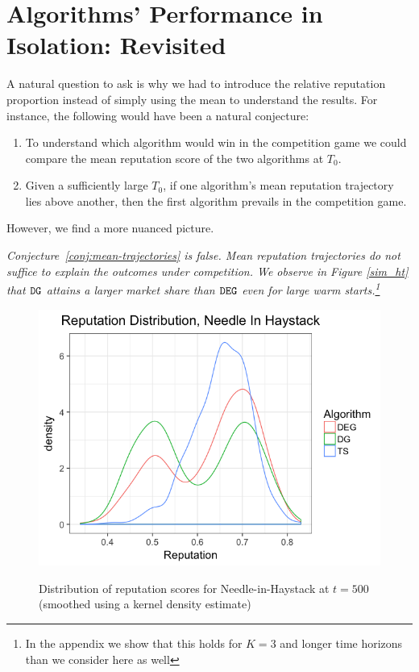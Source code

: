 \documentclass[../competing_bandits.tex]{subfiles}
\begin{document}
\section{Algorithms' Performance in Isolation: Revisited}\label{section:revisited}

A natural question to ask is why we had to introduce the relative reputation proportion instead of simply using the mean to understand the results. For instance, the following would have been a natural conjecture:
\begin{conjecture}\label{conj:mean-trajectories}
\begin{enumerate}
\item To understand which algorithm would win in the competition game we could compare the mean reputation score of the two algorithms at $T_0$.
\item Given a sufficiently large $T_0$, if one algorithm's mean reputation trajectory lies above another, then the first algorithm prevails in the competition game.
\end{enumerate}
\end{conjecture}

However, we find a more nuanced picture. 

\begin{finding}
\textit{
Conjecture~\ref{conj:mean-trajectories} is false. Mean reputation trajectories do not suffice to explain the outcomes under competition. We observe in Figure \ref{sim_ht} that $\mathtt{DG}$ attains a larger market share than $\mathtt{DEG}$ even for large warm starts.\footnote{In the appendix we show that this holds for $K = 3$ and longer time horizons than we consider here as well}}
\end{finding}

\begin{figure}[ht]
\caption{Distribution of reputation scores for Needle-in-Haystack at $t=500$ (smoothed using a kernel density estimate)}
\includegraphics[scale=0.35]{figures/rep_distribution_nih}
\label{rep_dist_nih}
\end{figure}
\end{document}
